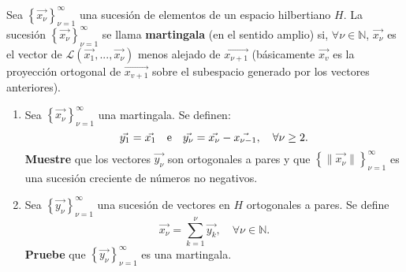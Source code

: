 \documentclass[12pt]{report}
\theoremstyle{largebreak}
\newcommand\norm[1]{\ensuremath{\|#1\|}}
\begin{document}
    \begin{excer}
        Sea $\left\{\vec{x_\nu} \right\}_{\nu=1}^\infty$ una sucesión de elementos de un espacio hilbertiano $H$. La sucesión $\left\{\vec{x_\nu} \right\}_{\nu=1}^\infty$ se llama \textbf{martingala} (en el sentido amplio) si, $\forall\nu\in\mathbb{N}$, $\vec{x_\nu}$ es el vector de $\mathcal{L}(\vec{x_1},...,\vec{x_\nu})$ menos alejado de $\vec{x_{\nu+1}}$ (básicamente $\vec{x_v}$ es la proyección ortogonal de $\vec{x_{v+1}}$ sobre el subespacio generado por los vectores anteriores).
        \begin{enumerate}
            \item Sea $\left\{\vec{x_\nu} \right\}_{\nu=1}^\infty$ una martingala. Se definen:
            \begin{equation*}
                \vec{y_1}=\vec{x_1}\quad\textup{e}\quad\vec{y_\nu}=\vec{x_\nu}-\vec{x_{\nu-1}},\quad\forall\nu\geq2.
            \end{equation*}
            \textbf{Muestre} que los vectores $\vec{y_\nu}$ son ortogonales a pares y que $\left\{\norm{\vec{x_\nu}} \right\}_{\nu=1}^\infty$ es una sucesión creciente de números no negativos.
            \item Sea $\left\{\vec{y_\nu} \right\}_{\nu=1}^\infty$ una sucesión de vectores en $H$ ortogonales a pares. Se define
            \begin{equation*}
                \vec{x_\nu}=\sum_{k=1}^\nu\vec{y_k},\quad\forall\nu\in\mathbb{N}.
            \end{equation*}
            \textbf{Pruebe} que $\left\{\vec{y_\nu} \right\}_{\nu=1}^\infty$ es una martingala.
        \end{enumerate}
    \end{excer}
\end{document}
